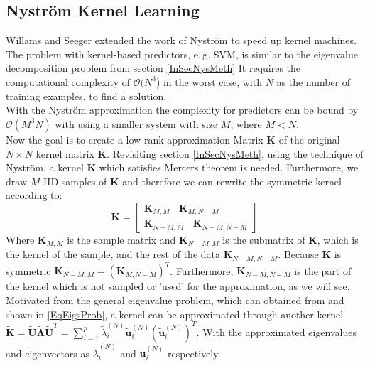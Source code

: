 \subsection{Nyström Kernel Learning}\label{InSubSecNyKerneLearning}
Willams and Seeger extended the work of Nyström to speed up kernel machines.
The problem with kernel-based predictors, e.\,g. \acs{SVM}, is similar to the eigenvalue decomposition problem from section \ref{InSecNysMeth}
It requires the computational complexity of $\mathcal{O}(N^3$) in the worst case, with $N$ as the number of training examples, to find a solution.\cite{Williams.2000}\\
With the Nyström approximation the complexity for predictors can be bound by $\mathcal{O}(M^3N)$ with using a smaller system with size $M$, where $M<N$.\cite{Williams.2000}\\	
Now the goal is to create a low-rank approximation Matrix $\tilde{\mathbf{K}}$ of the original $N\times N$ kernel matrix $\mathbf{K}$.
Revisiting section \ref{InSecNysMeth}, using the technique of Nyström, a kernel $\mathbf{K}$ which satisfies Mercers theorem is needed.\cite{Williams.2000}
Furthermore, we draw $M$ \acs{IID} samples of $\mathbf{K}$ and therefore we can rewrite the symmetric kernel according to:\cite{Nemtsov.2016}
\begin{equation}\label{EqNystKernelParts}
	\mathbf{K} = 
	\begin{bmatrix}
		 \mathbf{K}_{M,M}\>\>\>\> \mathbf{K}_{M,N-M} \\
		 \mathbf{K}_{N-M,M}\>\>\>\> \mathbf{K}_{N-M,N-M}
	\end{bmatrix}
\end{equation}
Where $\mathbf{K}_{M,M}$ is the sample matrix and $\mathbf{K}_{N-M,M}$ is the submatrix of $\mathbf{K}$, which is the kernel of the sample, and the rest of the data $\mathbf{K}_{N-M,N-M}$.
Because $\mathbf{K}$ is symmetric $\mathbf{K}_{N-M,M} = (\mathbf{K}_{M,N-M})^T$.
Furthermore, $\mathbf{K}_{N-M,N-M}$ is the part of the kernel which is not sampled or 'used' for the approximation, as we will see.\\
Motivated from the general eigenvalue problem, which can obtained from \cite[p. 221]{Hartmann.2015} and shown in \eqref{EqEigsProb}, a kernel can be approximated through another kernel $\tilde{\mathbf{K}} = \tilde{\mathbf{U}}\tilde{\mathbf{\Lambda}}\tilde{\mathbf{U}}^T=\sum_{i=1}^{p}\tilde{\lambda}_i^{(N)}\tilde{\mathbf{u}}_i^{(N)}(\tilde{\mathbf{u}}_i^{(N)})^T$.\cite{Williams.2000}
With the approximated eigenvalues and eigenvectors as $\tilde{\lambda}_i^{(N)}$ and $\tilde{\mathbf{u}}_i^{(N)}$ respectively.\\
